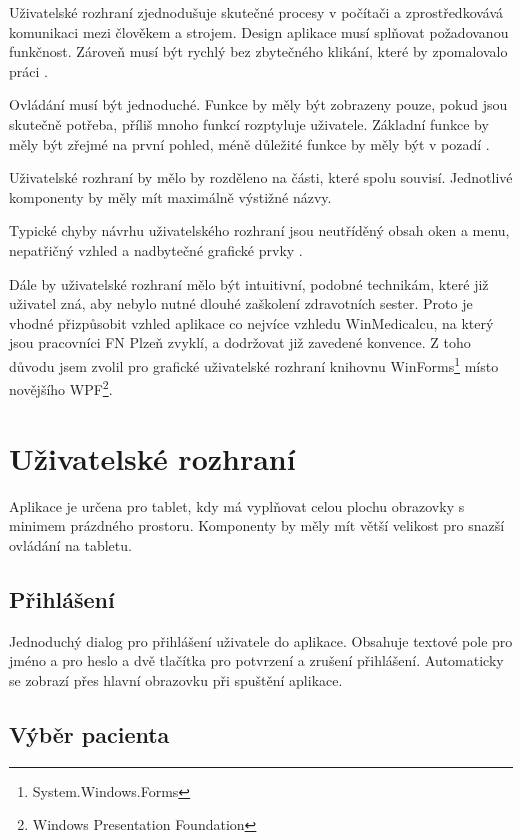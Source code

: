 Uživatelské rozhraní zjednodušuje skutečné procesy v počítači a zprostředkovává komunikaci mezi člověkem a strojem. Design aplikace musí splňovat požadovanou funkčnost. Zároveň musí být rychlý bez zbytečného klikání, které by zpomalovalo práci \cite{helander}.

Ovládání musí být jednoduché. Funkce by měly být zobrazeny pouze, pokud jsou skutečně potřeba, příliš mnoho funkcí rozptyluje uživatele. Základní funkce by měly být zřejmé na první pohled, méně důležité funkce by měly být v pozadí \cite{saffer}. 

Uživatelské rozhraní by mělo by rozděleno na části, které spolu souvisí. Jednotlivé komponenty by měly mít maximálně výstižné názvy.

Typické chyby návrhu uživatelského rozhraní jsou neutříděný obsah oken a menu, nepatřičný vzhled a nadbytečné grafické prvky \cite{sojka}.

Dále by uživatelské rozhraní mělo být intuitivní, podobné technikám, které již uživatel zná, aby nebylo nutné dlouhé zaškolení zdravotních sester. Proto je vhodné přizpůsobit vzhled aplikace co nejvíce vzhledu WinMedicalcu, na který jsou pracovníci FN Plzeň zvyklí, a dodržovat již zavedené konvence. Z toho důvodu jsem zvolil pro grafické uživatelské rozhraní knihovnu WinForms\footnote{System.Windows.Forms} místo novějšího WPF\footnote{Windows Presentation Foundation}.


\section{Uživatelské rozhraní}

Aplikace je určena pro tablet, kdy má vyplňovat celou plochu obrazovky s minimem prázdného prostoru. Komponenty by měly mít větší velikost pro snazší ovládání na tabletu.

\subsection{Přihlášení}

Jednoduchý dialog pro přihlášení uživatele do aplikace. Obsahuje textové pole pro jméno a pro heslo a dvě tlačítka pro potvrzení a zrušení přihlášení. Automaticky se zobrazí přes hlavní obrazovku při spuštění aplikace.

\subsection{Výběr pacienta}

